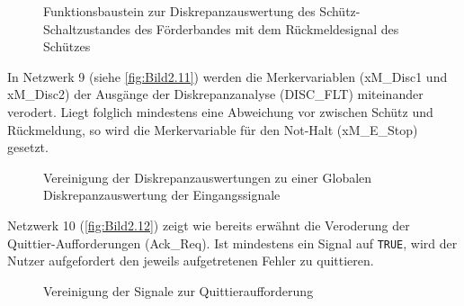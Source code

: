 \begin{figure}[H]
   \centering
   \caption[Diskrepanzauswertung Schütz Förderband]{Funktionsbaustein zur Diskrepanzauswertung des Schütz-Schaltzustandes des Förderbandes mit dem Rückmeldesignal des Schützes}
   \label{fig:Bild2.10}
\end{figure}

In Netzwerk 9 (siehe \autoref{fig:Bild2.11}) werden die Merkervariablen (xM\_Disc1 und xM\_Disc2) der Ausgänge der Diskrepanzanalyse (DISC\_FLT) miteinander verodert. Liegt folglich mindestens eine Abweichung vor zwischen Schütz und Rückmeldung, so wird die Merkervariable für den Not-Halt (xM\_E\_Stop) gesetzt.

\begin{figure}[H]
   \centering
   \caption[Globale Diskrepanzauswertung]{Vereinigung der Diskrepanzauswertungen zu einer Globalen Diskrepanzauswertung der Eingangssignale}
   \label{fig:Bild2.11}
\end{figure}

Netzwerk 10 (\autoref{fig:Bild2.12}) zeigt wie bereits erwähnt die Veroderung der Quittier-Aufforderungen (Ack\_Req). Ist mindestens ein Signal auf \texttt{TRUE}, wird der Nutzer aufgefordert den jeweils aufgetretenen Fehler zu quittieren.

\begin{figure}[H]
   \centering
   \caption[Vereinigung Quittieraufforderungen]{Vereinigung der Signale zur Quittieraufforderung}
   \label{fig:Bild2.12}
\end{figure}

